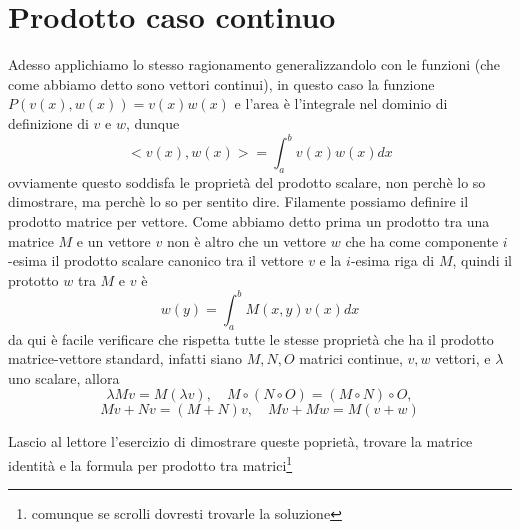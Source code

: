 \documentclass[11pt,a4paper]{article}
\theoremstyle{definition}
\theoremstyle{plain}
\theoremstyle{plain}
\begin{document}
	\section{Prodotto caso continuo}
		Adesso applichiamo lo stesso ragionamento generalizzandolo con le funzioni (che come abbiamo detto sono vettori continui), in questo caso la funzione $P(v(x),w(x))=v(x)w(x)$ e l'area è l'integrale nel dominio di definizione di $v$ e $w$, dunque
		\begin{equation}
			<v(x),w(x)>=\int_a^b v(x)w(x)dx
		\end{equation}
		ovviamente questo soddisfa le proprietà del prodotto scalare, non perchè lo so dimostrare, ma perchè lo so per sentito dire.\newline
		Filamente possiamo definire il prodotto matrice per vettore. Come abbiamo detto prima un prodotto tra una matrice $M$ e un vettore $v$ non è altro che un vettore $w$ che ha come componente $i$-esima il prodotto scalare canonico tra il vettore $v$ e la $i$-esima riga di $M$, quindi il prototto $w$ tra $M$ e $v$ è
		\begin{equation}
			w(y)=\int_a^b M(x,y)v(x) dx
		\end{equation}
		da qui è facile verificare che rispetta tutte le stesse proprietà che ha il prodotto matrice-vettore standard, infatti siano $M, N, O$ matrici continue, $v,w$ vettori, e $\lambda$ uno scalare, allora 
		\begin{equation}
			\lambda Mv= M(\lambda v),\quad M\circ (N \circ O)= (M \circ N) \circ O,
		\end{equation}
		\[
			Mv + Nv=  (M+N)v,\quad Mv+Mw=M(v+w)
		\]
		
		Lascio al lettore l'esercizio di dimostrare queste poprietà, trovare la matrice identità e la formula per prodotto tra matrici\footnote{comunque se scrolli dovresti trovarle la soluzione}
	
\end{document}
